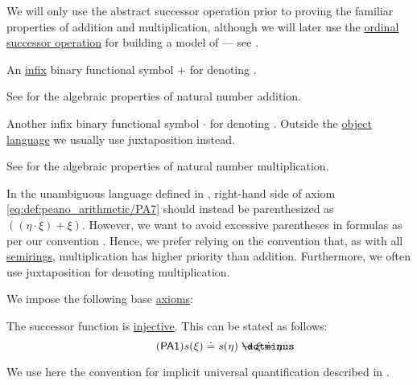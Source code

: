 \begin{definition}
\begin{thmenum}[series=def:peano_arithmetic]
    We will only use the abstract successor operation prior to proving the familiar properties of addition and multiplication, although we will later use the \hyperref[def:ordinal_successor]{ordinal successor operation} for building a model of  --- see .

     An \hyperref[rem:first_order_formula_conventions/infix]{infix} binary functional symbol \( + \) for denoting .

    See  for the algebraic properties of natural number addition.

     Another infix binary functional symbol \( \cdot \) for denoting . Outside the \hyperref[rem:metalogic]{object language} we usually use juxtaposition instead.

    See  for the algebraic properties of natural number multiplication.

    In the unambiguous language defined in , right-hand side of axiom \eqref{eq:def:peano_arithmetic/PA7} should instead be parenthesized as \( ((\eta \cdot \xi) + \xi) \). However, we want to avoid excessive parentheses in formulas as per our convention . Hence, we prefer relying on the convention that, as with all \hyperref[def:semiring]{semirings}, multiplication has higher priority than addition. Furthermore, we often use juxtaposition for denoting multiplication.
  \end{thmenum}

  We impose the following base \hyperref[def:first_order_theory/axiomatized]{axioms}:
  \begin{thmenum}[resume=def:peano_arithmetic]
     The successor function is \hyperref[thm:function_invertibility_categorical/nonempty_left_invertible]{injective}. This can be stated as follows:
    \begin{equation}\label{eq:def:peano_arithmetic/PA1}\tag{\logic{PA1}}
      s(\xi) \syneq s(\eta) \synimplies \xi \syneq \eta.
    \end{equation}

    We use here the convention for implicit universal quantification described in .


\end{thmenum}
\end{definition}
